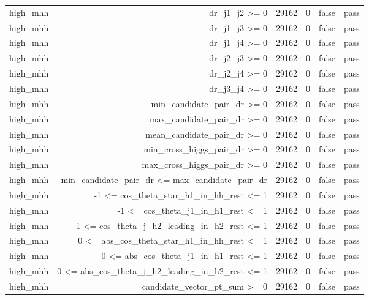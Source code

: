 \begin{table}[htbp]
{\begin{tabular}{lrrrrr}
high\_mhh & dr\_j1\_j2 >= 0 & 29162 & 0 & false & pass \\
high\_mhh & dr\_j1\_j3 >= 0 & 29162 & 0 & false & pass \\
high\_mhh & dr\_j1\_j4 >= 0 & 29162 & 0 & false & pass \\
high\_mhh & dr\_j2\_j3 >= 0 & 29162 & 0 & false & pass \\
high\_mhh & dr\_j2\_j4 >= 0 & 29162 & 0 & false & pass \\
high\_mhh & dr\_j3\_j4 >= 0 & 29162 & 0 & false & pass \\
high\_mhh & min\_candidate\_pair\_dr >= 0 & 29162 & 0 & false & pass \\
high\_mhh & max\_candidate\_pair\_dr >= 0 & 29162 & 0 & false & pass \\
high\_mhh & mean\_candidate\_pair\_dr >= 0 & 29162 & 0 & false & pass \\
high\_mhh & min\_cross\_higgs\_pair\_dr >= 0 & 29162 & 0 & false & pass \\
high\_mhh & max\_cross\_higgs\_pair\_dr >= 0 & 29162 & 0 & false & pass \\
high\_mhh & min\_candidate\_pair\_dr <= max\_candidate\_pair\_dr & 29162 & 0 & false & pass \\
high\_mhh & -1 <= cos\_theta\_star\_h1\_in\_hh\_rest <= 1 & 29162 & 0 & false & pass \\
high\_mhh & -1 <= cos\_theta\_j1\_in\_h1\_rest <= 1 & 29162 & 0 & false & pass \\
high\_mhh & -1 <= cos\_theta\_j\_h2\_leading\_in\_h2\_rest <= 1 & 29162 & 0 & false & pass \\
high\_mhh & 0 <= abs\_cos\_theta\_star\_h1\_in\_hh\_rest <= 1 & 29162 & 0 & false & pass \\
high\_mhh & 0 <= abs\_cos\_theta\_j1\_in\_h1\_rest <= 1 & 29162 & 0 & false & pass \\
high\_mhh & 0 <= abs\_cos\_theta\_j\_h2\_leading\_in\_h2\_rest <= 1 & 29162 & 0 & false & pass \\
high\_mhh & candidate\_vector\_pt\_sum >= 0 & 29162 & 0 & false & pass \\
\bottomrule
\end{tabular}
}
\end{table}
